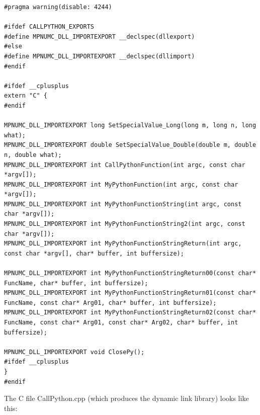 \begin{lstlisting}
#pragma warning(disable: 4244)

#ifdef CALLPYTHON_EXPORTS
#define MPNUMC_DLL_IMPORTEXPORT __declspec(dllexport)
#else
#define MPNUMC_DLL_IMPORTEXPORT __declspec(dllimport)
#endif

#ifdef __cplusplus
extern "C" {
#endif

MPNUMC_DLL_IMPORTEXPORT long SetSpecialValue_Long(long m, long n, long what);
MPNUMC_DLL_IMPORTEXPORT double SetSpecialValue_Double(double m, double n, double what);
MPNUMC_DLL_IMPORTEXPORT int CallPythonFunction(int argc, const char *argv[]);
MPNUMC_DLL_IMPORTEXPORT int MyPythonFunction(int argc, const char *argv[]);
MPNUMC_DLL_IMPORTEXPORT int MyPythonFunctionString(int argc, const char *argv[]);
MPNUMC_DLL_IMPORTEXPORT int MyPythonFunctionString2(int argc, const char *argv[]);
MPNUMC_DLL_IMPORTEXPORT int MyPythonFunctionStringReturn(int argc, const char *argv[], char* buffer, int buffersize);

MPNUMC_DLL_IMPORTEXPORT int MyPythonFunctionStringReturn00(const char* FuncName, char* buffer, int buffersize);
MPNUMC_DLL_IMPORTEXPORT int MyPythonFunctionStringReturn01(const char* FuncName, const char* Arg01, char* buffer, int buffersize);
MPNUMC_DLL_IMPORTEXPORT int MyPythonFunctionStringReturn02(const char* FuncName, const char* Arg01, const char* Arg02, char* buffer, int buffersize);

MPNUMC_DLL_IMPORTEXPORT void ClosePy();
#ifdef __cplusplus
}
#endif
\end{lstlisting}


The C file CallPython.cpp (which produces the dynamic link library) looks like this:


